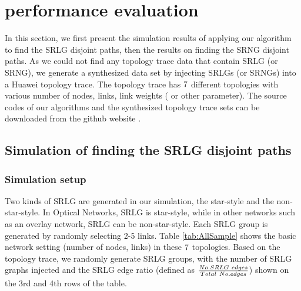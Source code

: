 \section{performance evaluation}
\label{sec:performance evaluation}
In this section, we first present the simulation results of applying our algorithm to find the SRLG disjoint paths, then the results on finding the SRNG disjoint paths. As we could not find any topology trace data that contain SRLG (or SRNG), we generate a synthesized data  set by injecting SRLGs (or SRNGs) into a Huawei topology trace. The topology trace has $7$ different topologies with various number of nodes, links, link weights ( or other parameter). The source codes of our algorithms and the synthesized topology trace sets can be downloaded from the github website \cite{code}.

\subsection{Simulation of finding the SRLG disjoint paths}
\subsubsection{Simulation setup}
\label{subsub:Simulation setup}
 Two kinds of SRLG are generated in our simulation, the star-style and the non-star-style. In Optical Networks, SRLG is star-style, while in other networks such as an overlay network, SRLG can be non-star-style. Each SRLG group is generated by randomly selecting 2-5 links. Table \ref{tab:AllSample} shows the basic network setting (number of nodes, links) in these $7$ topologies. Based on the topology trace, we randomly generate SRLG groups, with the number of SRLG graphs injected and the SRLG edge ratio (defined as $\frac{{No.SRLG \  {\rm{ }}edges}}{{Total \  {\rm{ }}No.edges}}$) shown on the 3rd and 4th rows of the table.





